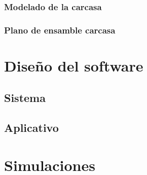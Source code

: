 \subsubsection{Modelado de la carcasa}
\subsubsection{Plano de ensamble carcasa}

\section{Diseño del software}
\subsection{Sistema}
\subsection{Aplicativo}


\section{Simulaciones}
